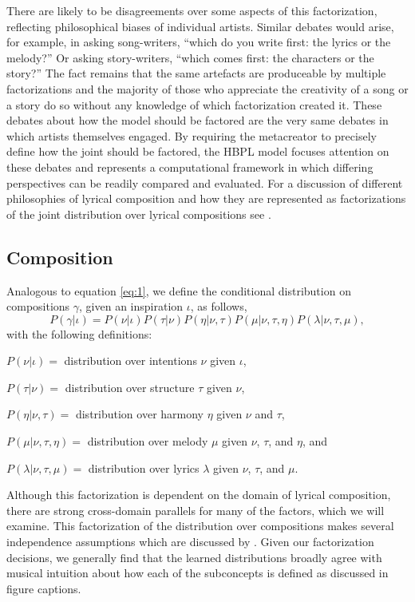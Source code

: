 \documentclass[phd,electronic,oneside,twosidetoc,letterpaper,chaptercenter,parttop,lol,lof,lot]{byumsphd}
\begin{document}
There are likely to be disagreements over some aspects of this factorization, reflecting philosophical biases of individual artists. Similar debates would arise, for example, in asking song-writers, ``which do you write first: the lyrics or the melody?'' Or asking story-writers, ``which comes first: the characters or the story?'' The fact remains that the same artefacts are produceable by multiple factorizations and the majority of those who appreciate the creativity of a song or a story do so without any knowledge of which factorization created it. These debates about how the model should be factored are the very same debates in which artists themselves engaged. By requiring the metacreator to precisely define how the joint should be factored, the HBPL model focuses attention on these debates and represents a computational framework in which differing perspectives can be readily compared and evaluated. For a discussion of different philosophies of lyrical composition and how they are represented as factorizations of the joint distribution over lyrical compositions see \citeauthor{bodily2017Mume} \cite{bodily2017Mume}.

\subsection{Composition}

Analogous to equation \ref{eq:1}, we define the conditional distribution on compositions $\gamma$, given an inspiration $\iota$, as follows,
\[ P(\gamma|\iota) = P(\nu|\iota)P(\tau|\nu)P(\eta|\nu,\tau)P(\mu|\nu,\tau,\eta)P(\lambda|\nu,\tau,\mu), \] 
\noindent with the following definitions:

\(P(\nu|\iota)=\) distribution over intentions $\nu$ given $\iota$,

\(P(\tau|\nu)=\) distribution over structure $\tau$ given $\nu$,

\(P(\eta|\nu,\tau)=\) distribution over harmony $\eta$ given $\nu$ and $\tau$,

\(P(\mu|\nu,\tau,\eta)=\) distribution over melody $\mu$ given $\nu$, $\tau$, and $\eta$, and

\(P(\lambda|\nu,\tau,\mu)=\) distribution over lyrics $\lambda$ given $\nu$, $\tau$, and $\mu$.

Although this factorization is dependent on the domain of lyrical composition, there are strong cross-domain parallels for many of the factors, which we will examine. This factorization of the distribution over compositions makes several independence assumptions which are discussed by \citeauthor{bodily2017Mume} \cite{bodily2017Mume}. Given our factorization decisions, we generally find that the learned distributions broadly agree with musical intuition about how each of the subconcepts is defined as discussed in figure captions.
\end{document}
